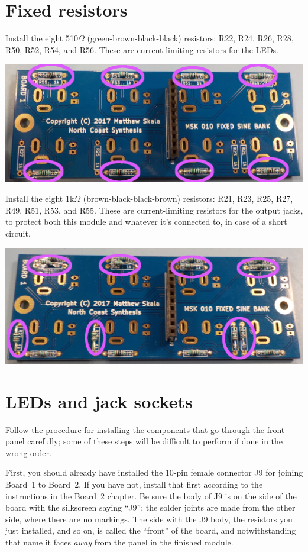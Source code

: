 \section{Fixed resistors}

Install the eight 510$\Omega$ (green-brown-black-black) resistors: R22, R24,
R26, R28, R50, R52, R54, and R56.  These are current-limiting resistors for
the LEDs.

\noindent\includegraphics[width=\linewidth]{res-910.jpg}

Install the eight 1k$\Omega$ (brown-black-black-brown) resistors: R21, R23,
R25, R27, R49, R51, R53, and R55.  These are current-limiting resistors for
the output jacks, to protect both this module and whatever it's connected
to, in case of a short circuit.

\noindent\includegraphics[width=\linewidth]{res-1k.jpg}

\section{LEDs and jack sockets}

Follow the procedure for installing the components that go through the front
panel carefully; some of these steps will be difficult to perform if done in
the wrong order.

First, you should already have installed the 10-pin female connector J9 for
joining Board~1 to Board~2.  If you have not, install that first according
to the instructions in the Board~2 chapter.  Be sure the body of J9 is on
the side of the board with the silkscreen saying ``J9''; the solder joints
are made from the other side, where there are no markings.  The side with
the J9 body, the resistors you just installed, and so on, is called the
``front'' of the board, and notwithstanding that name it faces \emph{away}
from the panel in the finished module.

